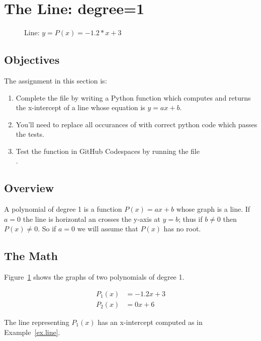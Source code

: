 \section{The Line: degree=1}
\label{sec.line}

\begin{figure}
  \centering
  
  \caption{Line: $y = P(x) = -1.2*x + 3$}
  \label{fig.line}
\end{figure}


\subsection{Objectives}
The assignment in this section is:
\begin{enumerate}
\item Complete the file  by writing a Python
  function which computes and returns the x-intercept of a line whose
  equation is ${y=a x + b}$.
\item You'll need to replace all occurances of 
  with correct python code which passes the tests.

\item Test the function in GitHub Codespaces by running the file\\
  .
\end{enumerate}

\subsection{Overview}


A polynomial of degree 1 is a function $P(x)=a x + b$ whose graph is a line.   If $a=0$ the
line is horizontal an crosses the y-axis at $y=b$; thus if $b\neq 0$ then $P(x)\neq 0$.
So if $a=0$ we will assume that $P(x)$ has no root.   

\subsection{The Math}


Figure~\ref{fig.line} shows the graphs of two polynomials of degree 1.

\begin{align*}
  P_1(x) &= -1.2 x + 3\\
  P_2(x) &= 0 x + 6
\end{align*}

The line representing $P_1(x)$ has an x-intercept computed as in Example~\ref{ex.line}.


